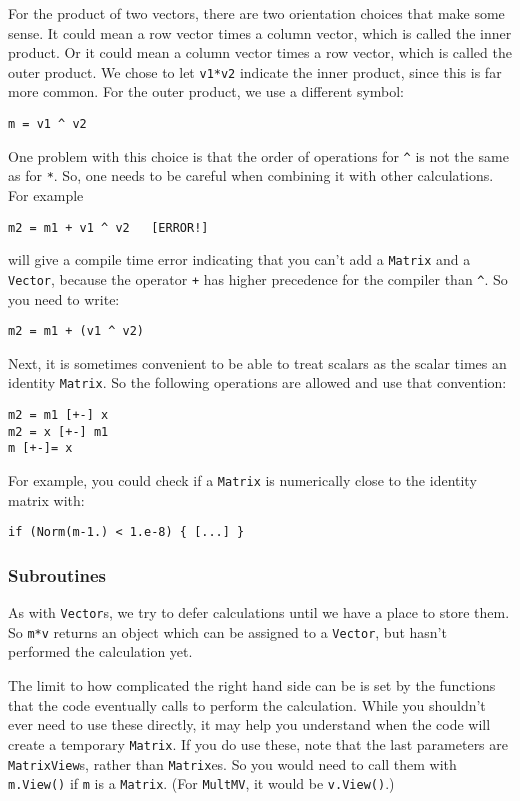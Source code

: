 \documentclass[twoside,letterpaper,11pt]{article}
\renewcommand{\tt}[1]{{\texttt {#1}}}
\begin{document}
For the product of two vectors, there are two orientation choices that make some sense.
It could mean a row vector times a column vector, which is called the inner product.
Or it could mean a column vector times a row vector, which is called the outer product.
We chose to let \tt{v1*v2} indicate the inner product, since this is far more common.
For the outer product, we use a different symbol:
\begin{verbatim}
m = v1 ^ v2
\end{verbatim}
One problem with this choice is that the order of operations for \tt{\^} 
is not the same as for \tt{*}.  
So, one needs to be careful when combining it with other calculations.
For example
\begin{verbatim}
m2 = m1 + v1 ^ v2   [ERROR!]
\end{verbatim}
will give a compile time error indicating that you can't add a 
\tt{Matrix} and a \tt{Vector}, 
because the operator \tt{+} has higher precedence for the compiler than \tt{\^}.
So you need to write:
\begin{verbatim}
m2 = m1 + (v1 ^ v2)
\end{verbatim}

Next, it is sometimes convenient to be able to treat scalars as the scalar times an
identity \tt{Matrix}.  So the following operations are allowed and use that convention:
\begin{verbatim}
m2 = m1 [+-] x
m2 = x [+-] m1
m [+-]= x
\end{verbatim}
For example, you could check if a \tt{Matrix} is numerically close to the identity matrix 
with:
\begin{verbatim}
if (Norm(m-1.) < 1.e-8) { [...] }
\end{verbatim}

\subsubsection{Subroutines}

As with \tt{Vector}s, we try to defer calculations until we have a place to store them.
So \tt{m*v} returns an object which can be assigned to a \tt{Vector},
but hasn't performed the calculation yet.  

The limit to how complicated the right hand side can be is set by the 
functions that the code eventually calls to perform the calculation.  
While you shouldn't ever
need to use these directly, it may help you understand when the code will create a
temporary \tt{Matrix}.  If you do use these, note that the last parameters are
\tt{MatrixView}s, rather than \tt{Matrix}es.  So you would need to 
call them with \tt{m.View()} if \tt{m} is a \tt{Matrix}.  (For \tt{MultMV},
it would be \tt{v.View()}.)
\end{document}
